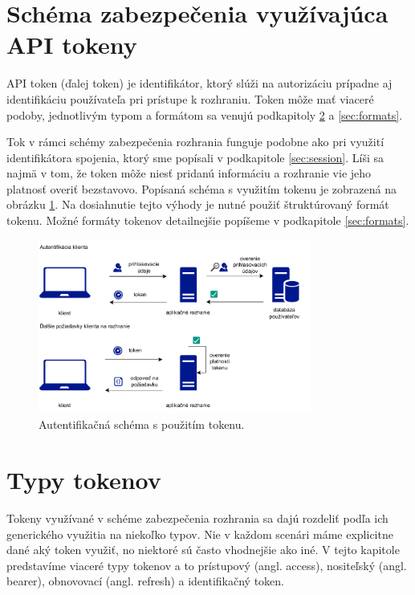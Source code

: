 \section{Schéma zabezpečenia využívajúca API tokeny}

API token (ďalej token) je identifikátor, ktorý slúži na autorizáciu prípadne aj identifikáciu používateľa pri prístupe k rozhraniu. Token môže mať viaceré podoby, jednotlivým typom a formátom sa venujú podkapitoly \ref{sec:types} a \ref{sec:formats}.

Tok v rámci schémy zabezpečenia rozhrania funguje podobne ako pri využití identifikátora spojenia, ktorý sme popísali v podkapitole \ref{sec:session}. Líši sa najmä v tom, že token môže niesť pridanú informáciu a rozhranie vie jeho platnosť overiť bezstavovo. Popísaná schéma s využitím tokenu je zobrazená na obrázku \ref{obr:token}. Na dosiahnutie tejto výhody je nutné použiť štruktúrovaný formát tokenu. Možné formáty tokenov detailnejšie popíšeme v podkapitole \ref{sec:formats}.


\begin{figure}
    \centerline{\includegraphics[width=0.8\textwidth]{images/token_schema}}
    \caption[Schéma s použitím tokenu]{Autentifikačná schéma s použitím tokenu.}
    \label{obr:token}
\end{figure}

\section{Typy tokenov}
\label{sec:types}

Tokeny využívané v schéme zabezpečenia rozhrania sa dajú rozdeliť podľa ich generického využitia na niekoľko typov. Nie v každom scenári máme explicitne dané aký token využiť, no niektoré sú často vhodnejšie ako iné. V tejto kapitole predstavíme viaceré typy tokenov a to prístupový (angl. access), nositeľský (angl. bearer), obnovovací (angl. refresh) a identifikačný token.

